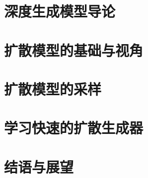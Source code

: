 \documentclass[examplefnt,biber]{nowfnt-arxiv}
\newtheorem[M]{question}{\sffamily\bfseries Question}[section]
\begin{document}


\part{深度生成模型导论}


\clearpage
\part{扩散模型的基础与视角}


\clearpage


\clearpage


\clearpage


\clearpage


\clearpage


\clearpage


\clearpage


\clearpage
\part{扩散模型的采样}


\clearpage


\clearpage


\clearpage

\part{学习快速的扩散生成器}


\clearpage


\clearpage

\part*{结语与展望}


\clearpage








\appendix



\clearpage


\clearpage


\clearpage


\clearpage




\backmatter  




\printbibliography
\end{document}
